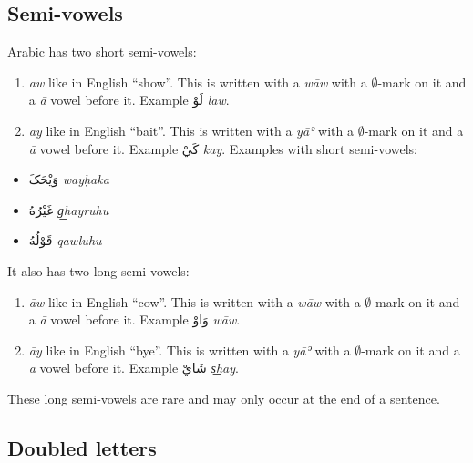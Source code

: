 \documentclass[
  10pt,
]{book}
\providecommand{\tightlist}{%
  \setlength{\itemsep}{0pt}\setlength{\parskip}{0pt}}
\begin{document}
\subsection{Semi-vowels}\label{semi-vowels}

Arabic has two short semi-vowels:

\begin{enumerate}
\def\labelenumi{\arabic{enumi}.}
\tightlist
\item
  \emph{aw} like in English \enquote{show}. This is written with a \emph{wāw} with a \(\emptyset\)-mark on it and a \emph{ā} vowel before it. Example \foreignlanguage{arabic}{لَوْ} \emph{law}.
\item
  \emph{ay} like in English \enquote{bait}. This is written with a \emph{yāʾ} with a \(\emptyset\)-mark on it and a \emph{ā} vowel before it. Example \foreignlanguage{arabic}{کَيْ} \emph{kay}.
  Examples with short semi-vowels:
\end{enumerate}

\begin{itemize}
\tightlist
\item
  \foreignlanguage{arabic}{وَيْحَکَ} \emph{wayḥaka}
\item
  \foreignlanguage{arabic}{غَيْرُهُ} \emph{g͟hayruhu}
\item
  \foreignlanguage{arabic}{قَوْلُهُ} \emph{qawluhu}
\end{itemize}

It also has two long semi-vowels:

\begin{enumerate}
\def\labelenumi{\arabic{enumi}.}
\tightlist
\item
  \emph{āw} like in English \enquote{cow}. This is written with a \emph{wāw} with a \(\emptyset\)-mark on it and a \emph{ā} vowel before it. Example \foreignlanguage{arabic}{وَاوْ} \emph{wāw}.
\item
  \emph{āy} like in English \enquote{bye}. This is written with a \emph{yāʾ} with a \(\emptyset\)-mark on it and a \emph{ā} vowel before it. Example \foreignlanguage{arabic}{شَايْ} \emph{s͟hāy}.
\end{enumerate}

These long semi-vowels are rare and may only occur at the end of a sentence.

\subsection{Doubled letters}\label{doubled-letters}
\end{document}
